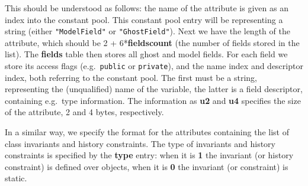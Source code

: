 This should be understood as follows: the name of the attribute is
given as an index into the constant pool. This constant pool entry
will be representing a string (either \texttt{"Model\unsc Field"} or
\texttt{"Ghost\unsc Field"}). Next we have the length of the
attribute, which should be 2 + 6*\textbf{fields\unsc count} (the number of
fields stored in the list). The \textbf{fields} table then stores all
ghost and model fields. For each field we store its access flags
(e.g.~\texttt{public} or \texttt{private}), and the name index and 
descriptor index, both referring to the constant pool. The first must be a
string, representing the (unqualified) name of the variable, the
latter is a field descriptor, containing e.g.~type
information.  The information as
\textbf{u2} and \textbf{u4} specifies the size of the attribute, 2 and
4 bytes, respectively.

In a similar way, we specify the format for the attributes containing
the list of class invariants and history constraints. The type of
invariants and history constraints is specified by the 
\textbf{type} entry: when it is \textbf{1} the invariant (or history
constraint) is defined over objects, when it is \textbf{0} the
invariant (or constraint) is static.

